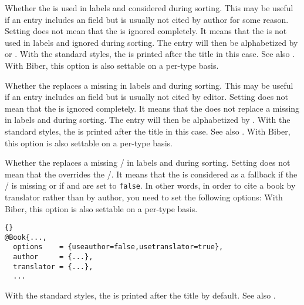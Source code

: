 \documentclass{ltxdockit}[2011/03/25]
\newcommand*{\biber}{Biber\xspace}
\begin{document}
\begin{optionlist}


Whether the  is used in labels and considered during sorting. This may be useful if an entry includes an  field but is usually not cited by author for some reason. Setting  does not mean that the  is ignored completely. It means that the  is not used in labels and ignored during sorting. The entry will then be alphabetized by  or . With the standard styles, the  is printed after the title in this case. See also .
\BiberOnlyMark With \biber, this option is also settable on a per-type basis.


Whether the  replaces a missing  in labels and during sorting. This may be useful if an entry includes an  field but is usually not cited by editor. Setting  does not mean that the  is ignored completely. It means that the  does not replace a missing  in labels and during sorting. The entry will then be alphabetized by . With the standard styles, the  is printed after the title in this case. See also .
\BiberOnlyMark With \biber, this option is also settable on a per-type basis.


Whether the  replaces a missing \slash {} in labels and during sorting. Setting  does not mean that the  overrides the \slash {}. It means that the  is considered as a fallback if the \slash {} is missing or if  and  are set to \texttt{false}. In other words, in order to cite a book by translator rather than by author, you need to set the following options:
\BiberOnlyMark With \biber, this option is also settable on a per-type basis.

\begin{lstlisting}[style=bibtex]{}
@Book{...,
  options    = {useauthor=false,usetranslator=true},
  author     = {...},
  translator = {...},
  ...
\end{lstlisting}
%
With the standard styles, the  is printed after the title by default. See also .


\end{optionlist}
\end{document}

